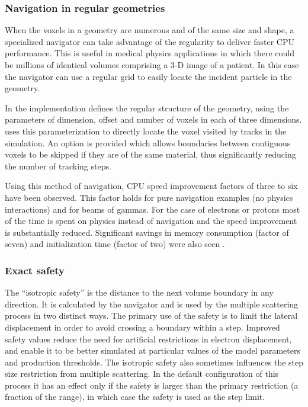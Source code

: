 \subsubsection{Navigation in regular geometries}
When the voxels in a geometry are numerous and of the same size and shape, a 
specialized navigator can take advantage of the regularity to deliver faster
CPU performance.  This is useful in medical physics applications in which there
could be millions of identical volumes comprising a 3-D image of a patient.
In this case the navigator can use a regular grid to easily 
locate the incident particle in the geometry.

In the \Gfour{} implementation 
defines the regular structure of the geometry, using the parameters of dimension, 
offset and number of voxels in each of three dimensions.   
uses this parameterization to directly locate the voxel visited by tracks in the
simulation.  An option is provided which allows boundaries between contiguous
voxels to be skipped if they are of the same material, thus significantly reducing
the number of tracking steps.

Using this method of navigation, CPU speed improvement factors of three to six
have been observed.  This factor holds for pure navigation examples (no physics 
interactions) and for beams of gammas.  For the case of electrons or protons
most of the time is spent on physics instead of navigation and the speed 
improvement is substantially reduced.  Significant savings in memory consumption
(factor of seven) and initialization time (factor of two) were also seen 
\cite{detmodeling:regnav}.

\subsubsection{Exact safety}
The ``isotropic safety'' is the distance to the next volume boundary in any 
direction.  It is calculated by the navigator and is used by the multiple 
scattering process in two distinct ways.  The primary use of the safety is to
limit the lateral displacement in order to avoid crossing a boundary within a
step.  Improved safety values reduce the need for artificial restrictions in 
electron displacement, and enable it to be better simulated at particular values
of the model parameters and production thresholds.  The isotropic safety also 
sometimes influences the step size restriction from multiple scattering.  In the
default configuration of this process it has an effect only if the safety is 
larger than the primary restriction (a fraction of the range), in which case the
safety is used as the step limit.     


